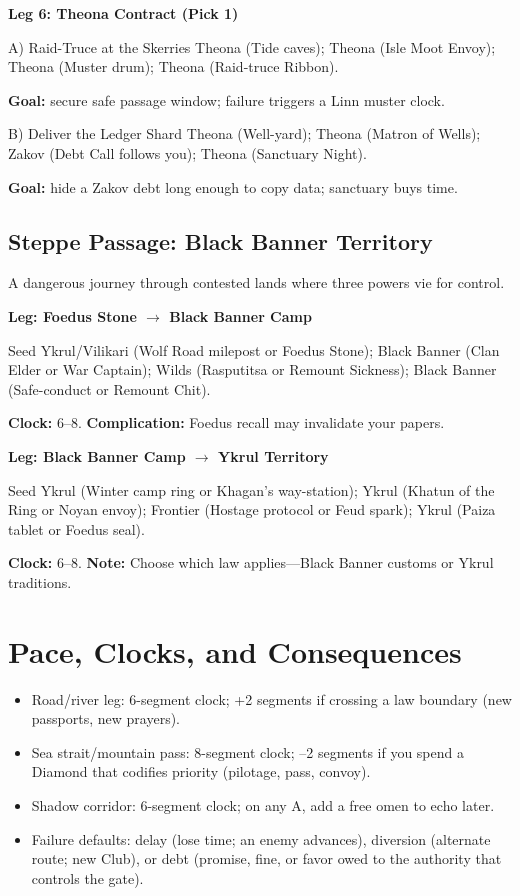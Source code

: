 \documentclass[11pt,letterpaper,twoside]{book}
\begin{document}
\textbf{Leg 6: Theona Contract (Pick 1)}
\begin{Leg}{A) Raid-Truce at the Skerries}
Theona \SuitSpade{} (Tide caves);
Theona \SuitHeart{} (Isle Moot Envoy);
Theona \SuitClub{} (Muster drum);
Theona \SuitDiamond{} (Raid-truce Ribbon).
\end{Leg}
\textbf{Goal:} secure safe passage window; failure triggers a Linn muster clock.

\begin{Leg}{B) Deliver the Ledger Shard}
Theona \SuitSpade{} (Well-yard);
Theona \SuitHeart{} (Matron of Wells);
Zakov \SuitClub{} (Debt Call follows you);
Theona \SuitDiamond{} (Sanctuary Night).
\end{Leg}
\textbf{Goal:} hide a Zakov debt long enough to copy data; sanctuary buys time.

\subsection{Steppe Passage: Black Banner Territory}
A dangerous journey through contested lands where three powers vie for control.

\textbf{Leg: Foedus Stone $\rightarrow$ Black Banner Camp}
\begin{Leg}{Seed}
Ykrul/Vilikari \SuitSpade{} (Wolf Road milepost or Foedus Stone);
Black Banner \SuitHeart{} (Clan Elder or War Captain);
Wilds \SuitClub{} (Rasputitsa or Remount Sickness);
Black Banner \SuitDiamond{} (Safe-conduct or Remount Chit).
\end{Leg}
\textbf{Clock:} 6--8. \textbf{Complication:} Foedus recall may invalidate your papers.

\textbf{Leg: Black Banner Camp $\rightarrow$ Ykrul Territory}
\begin{Leg}{Seed}
Ykrul \SuitSpade{} (Winter camp ring or Khagan's way-station);
Ykrul \SuitHeart{} (Khatun of the Ring or Noyan envoy);
Frontier \SuitClub{} (Hostage protocol or Feud spark);
Ykrul \SuitDiamond{} (Paiza tablet or Foedus seal).
\end{Leg}
\textbf{Clock:} 6--8. \textbf{Note:} Choose which law applies---Black Banner customs or Ykrul traditions.

\section{Pace, Clocks, and Consequences}

\begin{itemize}
\item Road/river leg: 6-segment clock; +2 segments if crossing a law boundary (new passports, new prayers).
\item Sea strait/mountain pass: 8-segment clock; --2 segments if you spend a Diamond that codifies priority (pilotage, pass, convoy).
\item Shadow corridor: 6-segment clock; on any A, add a free omen to echo later.
\item Failure defaults: delay (lose time; an enemy advances), diversion (alternate route; new Club), or debt (promise, fine, or favor owed to the authority that controls the gate).
\end{itemize}
\end{document}
